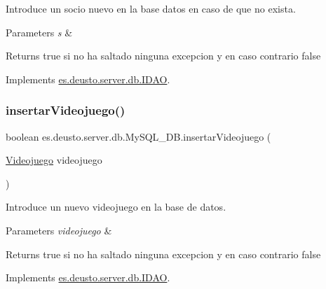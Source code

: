 Introduce un socio nuevo en la base datos en caso de que no exista. 
\begin{DoxyParams}{Parameters}
{\em s} & \\
\hline
\end{DoxyParams}
\begin{DoxyReturn}{Returns}
true si no ha saltado ninguna excepcion y en caso contrario false 
\end{DoxyReturn}


Implements \mbox{\hyperlink{interfacees_1_1deusto_1_1server_1_1db_1_1_i_d_a_o_a4b6652c5bec131e374c2243b579ea4cf}{es.\+deusto.\+server.\+db.\+I\+D\+AO}}.

\mbox{\label{classes_1_1deusto_1_1server_1_1db_1_1_my_s_q_l___d_b_a2da5706482d7ada9b3b1479fc172f956}} 
\subsubsection{\texorpdfstring{insertarVideojuego()}{insertarVideojuego()}}
{\footnotesize\ttfamily boolean es.\+deusto.\+server.\+db.\+My\+S\+Q\+L\+\_\+\+D\+B.\+insertar\+Videojuego (\begin{DoxyParamCaption}\item[{\mbox{\hyperlink{classes_1_1deusto_1_1client_1_1data_1_1_videojuego}{Videojuego}}}]{videojuego }\end{DoxyParamCaption})}

Introduce un nuevo videojuego en la base de datos. 
\begin{DoxyParams}{Parameters}
{\em videojuego} & \\
\hline
\end{DoxyParams}
\begin{DoxyReturn}{Returns}
true si no ha saltado ninguna excepcion y en caso contrario false 
\end{DoxyReturn}


Implements \mbox{\hyperlink{interfacees_1_1deusto_1_1server_1_1db_1_1_i_d_a_o_a6c40abe1ba302500ec0070a50c234ecf}{es.\+deusto.\+server.\+db.\+I\+D\+AO}}.

\mbox{\label{classes_1_1deusto_1_1server_1_1db_1_1_my_s_q_l___d_b_a96de9a556e05d6e04a2cb4553674a3ff}} 
